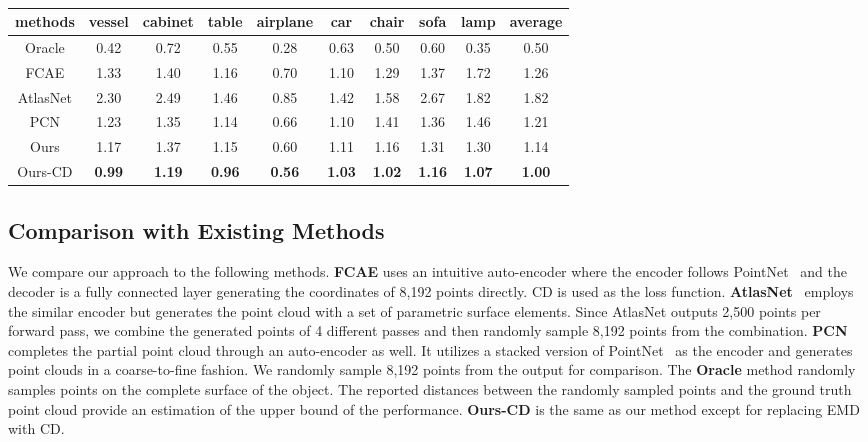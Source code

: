 \documentclass[letterpaper]{article} \usepackage{aaai20}  \usepackage{times}  \usepackage{helvet} \usepackage{courier}  \usepackage[hyphens]{url}  \usepackage{graphicx} \urlstyle{rm} \def\UrlFont{\rm}  \usepackage{graphicx}  \frenchspacing  \setlength{\pdfpagewidth}{8.5in}  \setlength{\pdfpageheight}{11in}  \usepackage{amsmath}
\begin{document}
\begin{table}[t]
\begin{subtable}{\linewidth}
\centering       
\setlength{\tabcolsep}{1.5pt}
    \begin{tabular}{c|cccccccc|c}
    \hline
    {\small methods}    & {\scriptsize vessel} & {\scriptsize cabinet} & {\scriptsize table} & {\scriptsize airplane} & {\scriptsize car} & {\scriptsize chair} & {\scriptsize sofa} & {\scriptsize lamp} & {\small average} \\
    \hline
    Oracle & 0.42  & 0.72  & 0.55  & 0.28  & 0.63  & 0.50  & 0.60  & 0.35  & 0.50  \\
    \hline
    FCAE  & 1.33  & 1.40  & 1.16  & 0.70  & 1.10  & 1.29  & 1.37  & 1.72  & 1.26  \\
    AtlasNet & 2.30  & 2.49  & 1.46  & 0.85  & 1.42  & 1.58  & 2.67  & 1.82  & 1.82  \\
    PCN   & 1.23  & 1.35  & 1.14  & 0.66  & 1.10  & 1.41  & 1.36  & 1.46  & 1.21  \\
    Ours  & 1.17  & 1.37  & 1.15  & 0.60  & 1.11  & 1.16  & 1.31  & 1.30  & 1.14  \\
    Ours-CD & \textbf{0.99} & \textbf{1.19} & \textbf{0.96} & \textbf{0.56} & \textbf{1.03} & \textbf{1.02} & \textbf{1.16} & \textbf{1.07} & \textbf{1.00} \\
    \hline
    \end{tabular}\caption{}
\end{subtable}  
\label{table:quantitative}
\end{table}  

\subsection{Comparison with Existing Methods}

We compare our approach to the following methods. \textbf{FCAE} uses an intuitive auto-encoder where the encoder follows PointNet~\cite{qi2017pointnet} and the decoder is a fully connected layer generating the coordinates of 8,192 points directly. CD is used as the loss function. \textbf{AtlasNet}~\cite{groueix2018papier} employs the similar encoder but generates the point cloud with a set of parametric surface elements. Since AtlasNet outputs 2,500 points per forward pass, we combine the generated points of 4 different passes and then randomly sample 8,192 points from the combination. \textbf{PCN}~\cite{yuan2018pcn} completes the partial point cloud through an auto-encoder as well. It utilizes a stacked version of PointNet~\cite{qi2017pointnet} as the encoder and generates point clouds in a coarse-to-fine fashion. We randomly sample 8,192 points from the output for comparison. The \textbf{Oracle} method randomly samples  points on the complete surface of the object. The reported distances between the randomly sampled points and the ground truth point cloud provide an estimation of the upper bound of the performance. \textbf{Ours-CD} is the same as our method except for replacing EMD with CD.
\end{document}
